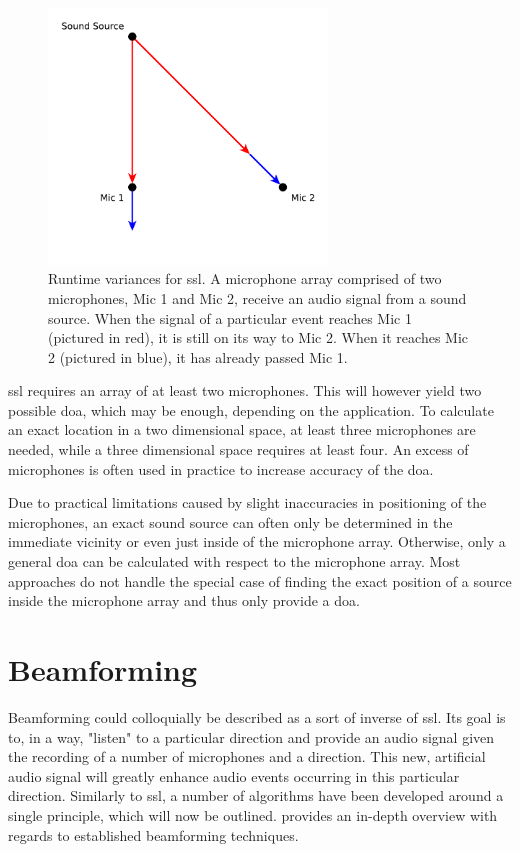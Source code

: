 \begin{figure}[]
	\centering
	\includegraphics[width=0.66\textwidth]{diagrams/basics_ssl.pdf}
	\caption{Runtime variances for \gls{ssl}.
		A microphone array comprised of two microphones, Mic 1 and Mic 2, receive an audio signal from a sound source.
		When the signal of a particular event reaches Mic 1 (pictured in red), it is still on its way to Mic 2.
		When it reaches Mic 2 (pictured in blue), it has already passed Mic 1.}
	\label{pic:basics:ssl}
\end{figure}

\gls{ssl} requires an array of at least two microphones.
This will however yield two possible \gls{doa}, which may be enough, depending on the application.
To calculate an exact location in a two dimensional space, at least three microphones are needed, while a three dimensional space requires at least four.
An excess of microphones is often used in practice to increase accuracy of the \gls{doa}.

Due to practical limitations caused by slight inaccuracies in positioning of the microphones, an exact sound source can often only be determined in the immediate vicinity or even just inside of the microphone array.
Otherwise, only a general \gls{doa} can be calculated with respect to the microphone array.
Most approaches do not handle the special case of finding the exact position of a source inside the microphone array and thus only provide a \gls{doa}.


\section{Beamforming}
Beamforming could colloquially be described as a sort of inverse of \gls{ssl}.
Its goal is to, in a way, "listen" to a particular direction and provide an audio signal given the recording of a number of microphones and a direction.
This new, artificial audio signal will greatly enhance audio events occurring in this particular direction.
Similarly to \gls{ssl}, a number of algorithms have been developed around a single principle, which will now be outlined.
\cite{1239145} provides an in-depth overview with regards to established beamforming techniques.

